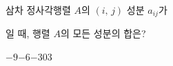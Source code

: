 \hspace*{2mm}\begin{minipage}[t]{\dimexpr\linewidth-2mm\relax}\vspace{0pt}
삼차 정사각행렬 $A$의 $(i,\,j)$ 성분 $a_{ij}$가 \par\smallskip{}\par\smallskip\noindent 일 때, 행렬 $A$의 모든 성분의 합은?
\begin{choices32}{$-9$}{$-6$}{$-3$}{$0$}{$3$}\end{choices32}\end{minipage}
